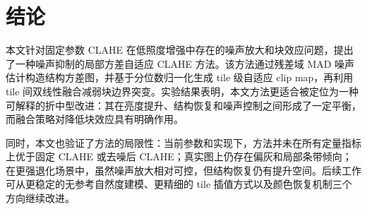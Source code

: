 \section{结论}

本文针对固定参数 CLAHE 在低照度增强中存在的噪声放大和块效应问题，提出了一种噪声抑制的局部方差自适应 CLAHE 方法。该方法通过残差域 MAD 噪声估计构造结构方差图，并基于分位数归一化生成 tile 级自适应 clip map，再利用 tile 间双线性融合减弱块边界突变。实验结果表明，本文方法更适合被定位为一种可解释的折中型改进：其在亮度提升、结构恢复和噪声控制之间形成了一定平衡，而融合策略对降低块效应具有明确作用。

同时，本文也验证了方法的局限性：当前参数和实现下，方法并未在所有定量指标上优于固定 CLAHE 或去噪后 CLAHE；真实图上仍存在偏灰和局部条带倾向；在更强退化场景中，虽然噪声放大相对可控，但结构恢复仍有提升空间。后续工作可从更稳定的无参考自然度建模、更精细的 tile 插值方式以及颜色恢复机制三个方向继续改进。
